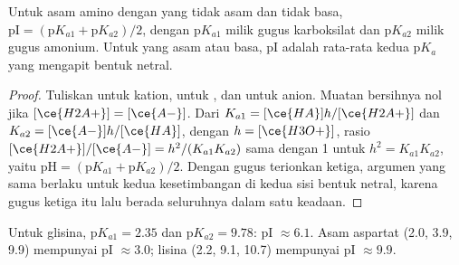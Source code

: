 \begin{proposition}\label{prop:b2:biomolecules:pi}
Untuk asam amino dengan  yang tidak asam dan tidak basa,
$\mathrm{pI} = (\mathrm pK_{a1} +
\mathrm pK_{a2})/2$, dengan $\mathrm pK_{a1}$ milik gugus karboksilat dan
$\mathrm pK_{a2}$ milik gugus amonium. Untuk  yang asam atau
basa, pI adalah rata-rata kedua $\mathrm pK_a$ yang mengapit bentuk netral.
\end{proposition}

\begin{proof}
Tuliskan  untuk kation,  untuk , dan  untuk
anion. Muatan bersihnya nol jika $[\ce{H2A+}] = [\ce{A-}]$. Dari $K_{a1} = [\ce{HA}]h/[\ce{H2A+}]$ dan $K_{a2} =
[\ce{A-}]h/[\ce{HA}]$, dengan $h = [\ce{H3O+}]$, rasio $[\ce{H2A+}]/[\ce{A-}] = h^2/(K_{a1}K_{a2})$
sama dengan 1 untuk $h^2 = K_{a1}K_{a2}$, yaitu $\mathrm{pH} = (\mathrm pK_{a1} + \mathrm pK_{a2})/2$.
Dengan gugus terionkan ketiga, argumen yang sama berlaku untuk kedua
kesetimbangan di kedua sisi bentuk netral, karena gugus ketiga itu lalu
berada seluruhnya dalam satu keadaan.
\end{proof}

Untuk glisina, $\mathrm pK_{a1} = 2.35$ dan $\mathrm pK_{a2} = 9.78$: pI $\approx 6.1$.
Asam aspartat (2.0, 3.9, 9.9) mempunyai pI $\approx 3.0$; lisina (2.2, 9.1, 10.7) mempunyai pI $\approx 9.9$.

